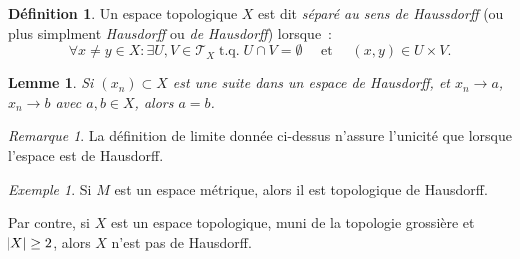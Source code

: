 \documentclass{report}
\newtheorem{lem}[thm]{Lemme}
\theoremstyle{definition}
\newtheorem{déf}[thm]{Définition}
\theoremstyle{remark}
\newtheorem*{rmq}{Remarque}
\newtheorem{ex}{Exemple}[chapter]
\DeclareMathOperator{\tq}{\text{ t.q. }}
\renewcommand{\top}{\mathcal T}
\begin{document}
	\begin{déf} Un espace topologique $X$ est dit \textit{séparé au sens de Haussdorff} (ou plus simplment \textit{Hausdorff} ou \textit{de Hausdorff}) lorsque~:
	\[\forall x \neq y \in X : \exists U, V \in \top_X \tq U \cap V = \emptyset \quad \text{ et } \quad (x, y) \in U \times V.\]
	\end{déf}

	\begin{lem} Si $(x_n) \subset X$ est une suite dans un espace de Hausdorff, et $x_n \to a$, $x_n \to b$ avec $a, b \in X$, alors $a = b$.
	\end{lem}

	\begin{rmq} La définition de limite donnée ci-dessus n'assure l'unicité que lorsque l'espace est de Hausdorff.
	\end{rmq}

	\begin{ex} Si $M$ est un espace métrique, alors il est topologique de Hausdorff.

	Par contre, si $X$ est un espace topologique, muni de la topologie grossière et $\abs X \geq 2$, alors $X$ n'est pas de Hausdorff.
	\end{ex}
\end{document}
